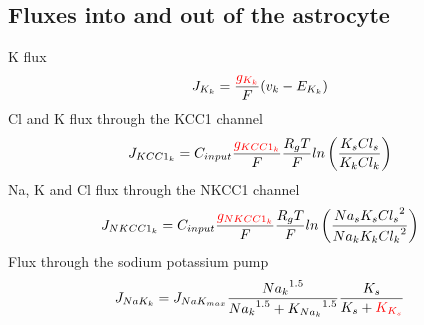 \documentclass[fleqn]{report}
\numberwithin{equation}{section}
\numberwithin{equation}{section}
\begin{document}
\subsection{Fluxes into and out of the astrocyte}
\gls{K} flux  
\begin{equation} \label{eq:J_K}
J_{K_k}=\frac{\textcolor{red}{g_{K_{k}}}}{F}(v_k - E_{K_k})
\end{equation}
%
%
%
\gls{Cl} and \gls{K} flux through the KCC1 channel  
\begin{equation} \label{eq:J_KCC1}
J_{KCC1_k}=C_{input}\frac{\textcolor{red}{g_{KCC1_k}}}{F}\frac{R_gT}{F}ln \left(\frac{K_s Cl_s }{K_k Cl_k}\right)
\end{equation}
%
\gls{Na}, \gls{K} and \gls{Cl} flux through the NKCC1 channel   
\begin{equation} \label{eq:J_NKCC1}
J_{NKCC1_k}=C_{input}\frac{\textcolor{red}{g_{NKCC1_k}}}{F}\frac{R_gT}{F}ln \left(\frac{Na_s K_s {Cl_s}^2}{Na_k K_k {Cl_k}^2}\right)
\end{equation}
%
Flux through the sodium potassium pump   
\begin{equation} \label{eq:J_NaK_s}
J_{NaK_{k}}=J_{NaK_{max}}\frac{{Na_k}^{1.5}}{{Na_k}^{1.5}+{K_{Na_k}}^{1.5}}\frac{K_s}{K_s+\textcolor{red}{K_{K_s}}}
\end{equation}
%

\end{document}
